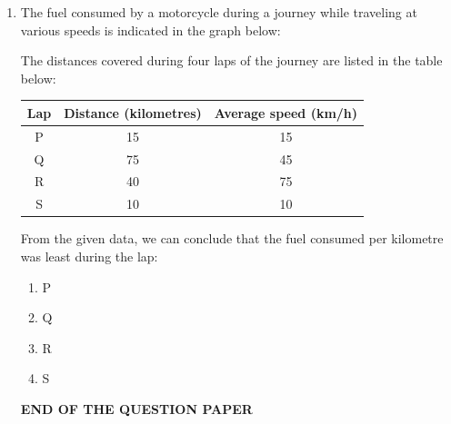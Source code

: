 \documentclass[journal,12pt,onecolumn]{IEEEtran}
\theoremstyle{remark}
\begin{document}
\begin{enumerate}
 

\item    \hspace{0.5cm} The fuel consumed by a motorcycle during a journey while traveling at various speeds is indicated in the graph below:  \hfill{}

 
 

The distances covered during four laps of the journey are listed in the table below:

 
\begin{center}
\begin{tabular}{|c|c|c|}
\hline
\textbf{Lap} & \textbf{Distance (kilometres)} & \textbf{Average speed (km/h)} \\
\hline
P & 15 & 15 \\
Q & 75 & 45 \\
R & 40 & 75 \\
S & 10 & 10 \\
\hline
\end{tabular}
\end{center}

 
From the given data, we can conclude that the fuel consumed per kilometre was least during the lap:

\begin{multicols}{2}
\begin{enumerate}
    \item P
    \item Q
    \item R
    \item S
\end{enumerate}
\end{multicols}

 

\centerline{\textbf{END OF THE QUESTION PAPER}}


\end{enumerate}
\end{document}
